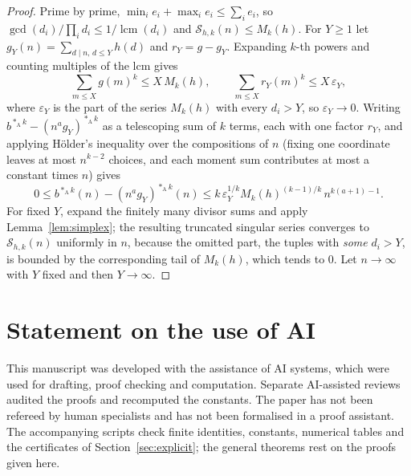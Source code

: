 \documentclass[11pt,a4paper]{article}
\theoremstyle{remark}
\numberwithin{equation}{section}
\newcommand{\Sing}{\mathcal S}
\newcommand{\lcm}{\operatorname{lcm}}
\newcommand{\Ac}{*_{\mathrm A}}
\begin{document}
\begin{proof}
Prime by prime, $\min_ie_i+\max_ie_i\le\sum_ie_i$, so $\gcd(d_i)/\prod_id_i\le1/\lcm(d_i)$ and $\Sing_{h,k}(n)\le M_k(h)$. For $Y\ge1$ let $g_Y(n)=\sum_{d\mid n,\,d\le Y}h(d)$ and $r_Y=g-g_Y$. Expanding $k$-th powers and counting multiples of the lcm gives
\[
\sum_{m\le X}g(m)^k\le X\,M_k(h),\qquad\sum_{m\le X}r_Y(m)^k\le X\,\varepsilon_Y,
\]
where $\varepsilon_Y$ is the part of the series $M_k(h)$ with every $d_i>Y$, so $\varepsilon_Y\to0$. Writing $b^{\Ac k}-(n^ag_Y)^{\Ac k}$ as a telescoping sum of $k$ terms, each with one factor $r_Y$, and applying H\"older's inequality over the compositions of $n$ (fixing one coordinate leaves at most $n^{k-2}$ choices, and each moment sum contributes at most a constant times $n$) gives
\[
0\le b^{\Ac k}(n)-(n^ag_Y)^{\Ac k}(n)\le k\,\varepsilon_Y^{1/k}M_k(h)^{(k-1)/k}\,n^{k(a+1)-1}.
\]
For fixed $Y$, expand the finitely many divisor sums and apply Lemma~\ref{lem:simplex}; the resulting truncated singular series converges to $\Sing_{h,k}(n)$ uniformly in $n$, because the omitted part, the tuples with \emph{some} $d_i>Y$, is bounded by the corresponding tail of $M_k(h)$, which tends to $0$. Let $n\to\infty$ with $Y$ fixed and then $Y\to\infty$.
\end{proof}

\section*{Statement on the use of AI}
This manuscript was developed with the assistance of AI systems, which were used for drafting, proof checking and computation. Separate AI-assisted reviews audited the proofs and recomputed the constants. The paper has not been refereed by human specialists and has not been formalised in a proof assistant. The accompanying scripts check finite identities, constants, numerical tables and the certificates of Section~\ref{sec:explicit}; the general theorems rest on the proofs given here.
\end{document}
